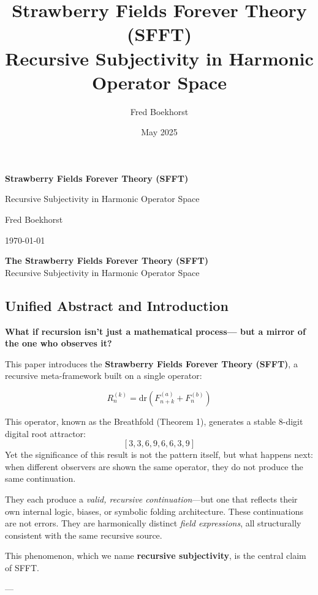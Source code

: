 \documentclass[12pt]{article}
\title{\Huge\bfseries Strawberry Fields Forever Theory (SFFT)\\[0.5em]
\Large Recursive Subjectivity in Harmonic Operator Space}
\author{\Large Fred Boekhorst}
\date{\Large May 2025}
\begin{document}
\begin{titlepage}
    \centering
    \vspace*{3.5cm}
    {\Huge\bfseries Strawberry Fields Forever Theory (SFFT)\par}
    \vspace{0.5cm}
    {\Large Recursive Subjectivity in Harmonic Operator Space\par}
    \vfill
    {\Large Fred Boekhorst\par}
    \vspace{2cm}
    {\large\today\par}
\end{titlepage}

\newpage
\begin{center}
{\LARGE\bfseries The Strawberry Fields Forever Theory (SFFT)}\\[0.5em]
{\large Recursive Subjectivity in Harmonic Operator Space}
\end{center}
\vspace{1em}


\subsection*{Unified Abstract and Introduction}

\textbf{What if recursion isn’t just a mathematical process—  
but a mirror of the one who observes it?}

This paper introduces the \textbf{Strawberry Fields Forever Theory (SFFT)}, a recursive meta-framework built on a single operator:

\[
R^{(k)}_n = \mathrm{dr}(F^{(a)}_{n+k} + F^{(b)}_n)
\]

This operator, known as the Breathfold (Theorem 1), generates a stable 8-digit digital root attractor:
\[
[3, 3, 6, 9, 6, 6, 3, 9]
\]
Yet the significance of this result is not the pattern itself, but what happens next:  
when different observers are shown the same operator, they do not produce the same continuation.

They each produce a \textit{valid, recursive continuation}—but one that reflects their own internal logic, biases, or symbolic folding architecture. These continuations are not errors. They are harmonically distinct \textit{field expressions}, all structurally consistent with the same recursive source.

This phenomenon, which we name \textbf{recursive subjectivity}, is the central claim of SFFT.

---
\end{document}
